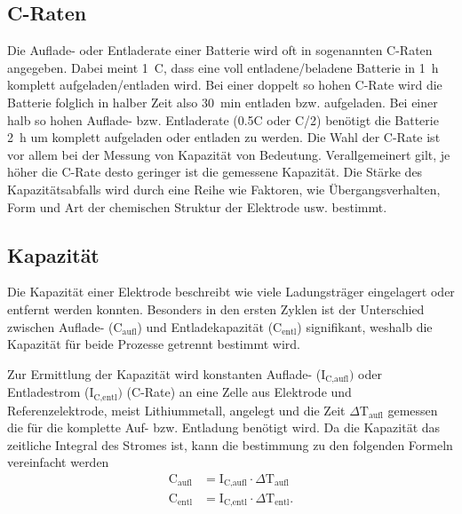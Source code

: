 \subsection{C-Raten}
Die Auflade- oder Entladerate einer Batterie wird oft in sogenannten C-Raten angegeben. Dabei meint 1~C, dass eine voll entladene/beladene Batterie in 1~h komplett aufgeladen/entladen wird. Bei einer doppelt so hohen C-Rate wird die Batterie folglich in halber Zeit also 30~min entladen bzw. aufgeladen. Bei einer halb so hohen Auflade- bzw. Entladerate (0.5C oder C/2) benötigt die Batterie 2~h um komplett aufgeladen oder entladen zu werden.
Die Wahl der C-Rate ist vor allem bei der Messung von Kapazität von Bedeutung.
Verallgemeinert gilt, je höher die C-Rate desto geringer ist die gemessene Kapazität. Die Stärke des Kapazitätsabfalls wird durch eine Reihe wie Faktoren, wie Übergangsverhalten, Form und Art der chemischen Struktur der Elektrode usw. bestimmt.

\subsection{Kapazität}
Die Kapazität einer Elektrode beschreibt wie viele Ladungsträger eingelagert oder entfernt werden konnten. Besonders in den ersten Zyklen ist der Unterschied zwischen Auflade- ($\text{C}_{\text{aufl}}$) und Entladekapazität ($\text{C}_{\text{entl}}$) signifikant, weshalb die Kapazität für beide Prozesse getrennt bestimmt wird.

Zur Ermittlung der Kapazität wird konstanten Auflade- ($\text{I}_\text{C,aufl})$ oder Entladestrom ($\text{I}_\text{C,entl})$ (C-Rate) an eine Zelle aus Elektrode und Referenzelektrode, meist Lithiummetall, angelegt und die Zeit $\Delta \text{T}_\text{aufl}$ gemessen die für die komplette Auf- bzw. Entladung benötigt wird. Da die Kapazität das zeitliche Integral des Stromes ist, kann die bestimmung zu den folgenden Formeln vereinfacht werden
\begin{align}
	\text{C}_{\text{aufl}} &= \text{I}_\text{C,aufl} \cdot \Delta \text{T}_\text{aufl}\\
	\text{C}_{\text{entl}} &= \text{I}_\text{C,entl} \cdot \Delta \text{T}_\text{entl}.
\end{align}


